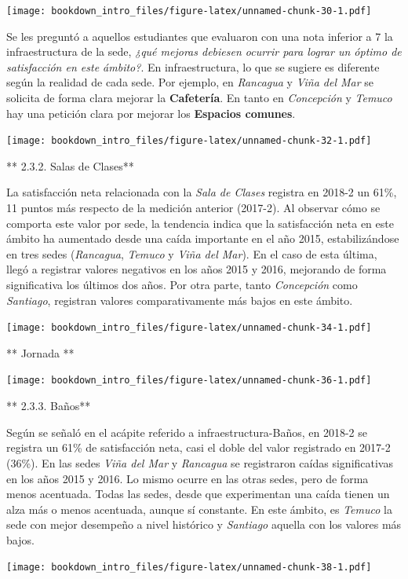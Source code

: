 \documentclass[]{book}
\begin{document}
\texttt{[image: bookdown\_intro\_files/figure-latex/unnamed-chunk-30-1.pdf]}

Se les preguntó a aquellos estudiantes que evaluaron con una nota
inferior a 7 la infraestructura de la sede, \emph{¿qué mejoras debiesen
ocurrir para lograr un óptimo de satisfacción en este ámbito?}. En
infraestructura, lo que se sugiere es diferente según la realidad de
cada sede. Por ejemplo, en \emph{Rancagua} y \emph{Viña del Mar} se
solicita de forma clara mejorar la \textbf{Cafetería}. En tanto en
\emph{Concepción} y \emph{Temuco} hay una petición clara por mejorar los
\textbf{Espacios comunes}.

\texttt{[image: bookdown\_intro\_files/figure-latex/unnamed-chunk-32-1.pdf]}

** 2.3.2. Salas de Clases**

La satisfacción neta relacionada con la \emph{Sala de Clases} registra
en 2018-2 un 61\%, 11 puntos más respecto de la medición anterior
(2017-2). Al observar cómo se comporta este valor por sede, la tendencia
indica que la satisfacción neta en este ámbito ha aumentado desde una
caída importante en el año 2015, estabilizándose en tres sedes
(\emph{Rancagua}, \emph{Temuco} y \emph{Viña del Mar}). En el caso de
esta última, llegó a registrar valores negativos en los años 2015 y
2016, mejorando de forma significativa los últimos dos años. Por otra
parte, tanto \emph{Concepción} como \emph{Santiago}, registran valores
comparativamente más bajos en este ámbito.

\texttt{[image: bookdown\_intro\_files/figure-latex/unnamed-chunk-34-1.pdf]}

** Jornada **

\texttt{[image: bookdown\_intro\_files/figure-latex/unnamed-chunk-36-1.pdf]}

** 2.3.3. Baños**

Según se señaló en el acápite referido a infraestructura-Baños, en
2018-2 se registra un 61\% de satisfacción neta, casi el doble del valor
registrado en 2017-2 (36\%). En las sedes \emph{Viña del Mar} y
\emph{Rancagua} se registraron caídas significativas en los años 2015 y
2016. Lo mismo ocurre en las otras sedes, pero de forma menos acentuada.
Todas las sedes, desde que experimentan una caída tienen un alza más o
menos acentuada, aunque sí constante. En este ámbito, es \emph{Temuco}
la sede con mejor desempeño a nivel histórico y \emph{Santiago} aquella
con los valores más bajos.

\texttt{[image: bookdown\_intro\_files/figure-latex/unnamed-chunk-38-1.pdf]}
\end{document}
